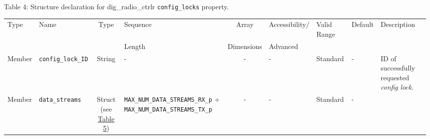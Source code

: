 \documentclass{article}
\def\comp{dig\_radio\_ctrlr}
\begin{document}
\begin{landscape}
	\noindent Table \hypertarget{tab4}{4}: Structure declaration for \comp{} \verb+config_locks+ property.
	\begin{scriptsize}
		\noindent\begin{longtable}{|p{1.8cm}|p{3.6cm}|c|p{4cm}|c|p{2cm}|p{1.7cm}|p{0.8cm}|p{3.10cm}|}
			\hline
			\rowcolor{blue}
			Type         & Name                                & Type & Sequence & Array      & Accessibility/ & Valid Range  & Default & Description                                                                                                                                                                                                                       \\
			\rowcolor{blue}
			             &                                     &      & Length   & Dimensions & Advanced       &              &         &                                                                                                                                                                                                                             \\
			\hline
			Member       & \verb+config_lock_ID+               & String& -       & -          & -              & Standard     & -       & ID of successfully requested \textit{config lock}. \\
			\hline
			Member       & \verb+data_streams+                 & Struct (see \hyperlink{tab5}{Table 5}) & \verb+MAX_NUM_DATA_STREAMS_RX_p+ + \verb+MAX_NUM_DATA_STREAMS_TX_p+ & - & - & Standard & - & \\
			\hline
		\end{longtable}
	\end{scriptsize}


\end{landscape}
\end{document}
